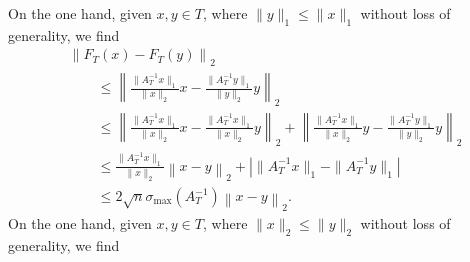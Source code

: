 \documentclass[a4paper]{article}
\begin{document}
        
\color{red}
        On the one hand, given $x, y \in T$, 
        where $\| y \|_{1} \leq \| x \|_{1}$ without loss of generality, we find 
        \begin{align*}
            &
            \left\| F_T(x) - F_T(y) \right\|_{2}
            \\&\qquad 
            \leq 
            \left\| 
                \frac{ \| A_{T}^{-1} x \|_{1} }{ \|x\|_2 } x - \frac{ \| A_{T}^{-1} y \|_{1} }{ \|y\|_2 } y
            \right\|_{2}
            \\&\qquad 
            \leq 
            \left\| 
                \frac{ \| A_{T}^{-1} x \|_{1} }{ \|x\|_2 } x - \frac{ \| A_{T}^{-1} x \|_{1} }{ \|x\|_2 } y
            \right\|_{2}
            +
            \left\| 
                \frac{ \| A_{T}^{-1} x \|_{1} }{ \|x\|_2 } y - \frac{ \| A_{T}^{-1} y \|_{1} }{ \|y\|_2 } y
            \right\|_{2}
            \\&\qquad 
            \leq 
            \frac{ \| A_{T}^{-1} x \|_{1} }{ \|x\|_2 } 
            \left\| 
                x - y
            \right\|_{2}
            +
            \left| \|A_{T}^{-1} x\|_1 - \|A_{T}^{-1} y\|_1 \right|
            \\&\qquad 
            \leq 
            2\sqrt{n} \sigma_{\max}(A_{T}^{-1}) 
            \left\| x - y \right\|_{2}
            .
        \end{align*}
        On the one hand, given $x, y \in T$, 
        where $\| x \|_{2} \leq \| y \|_{2}$ without loss of generality, we find 
\end{document}
